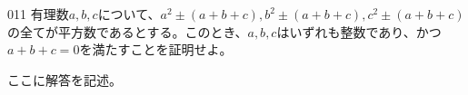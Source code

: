 \begin{prob}{011}{}{}
 有理数$a,b,c$について、$a^2\pm (a+b+c), b^2\pm (a+b+c), c^2\pm (a+b+c)$の全てが平方数であるとする。このとき、$a,b,c$はいずれも整数であり、かつ$a+b+c=0$を満たすことを証明せよ。
\end{prob}
ここに解答を記述。